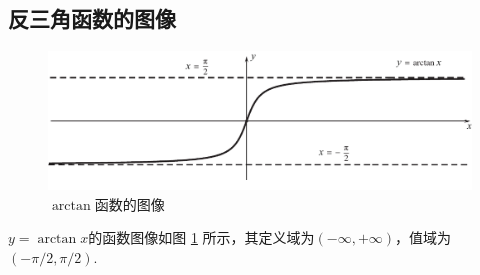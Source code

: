 \subsection{反三角函数的图像}
\begin{figure}[!htb]
	\centering
	\includegraphics[width = 0.9\linewidth]{pic/C-F/arctan.pdf}
	\vspace*{-1em}
	\caption{$\arctan$函数的图像}
	\label{atan}
\end{figure}
$y = \arctan x$的函数图像如图 \ref{atan} 所示，其定义域为$(-\infty, + \infty)$，值域为$(-\pi/2, \pi/2)$.

